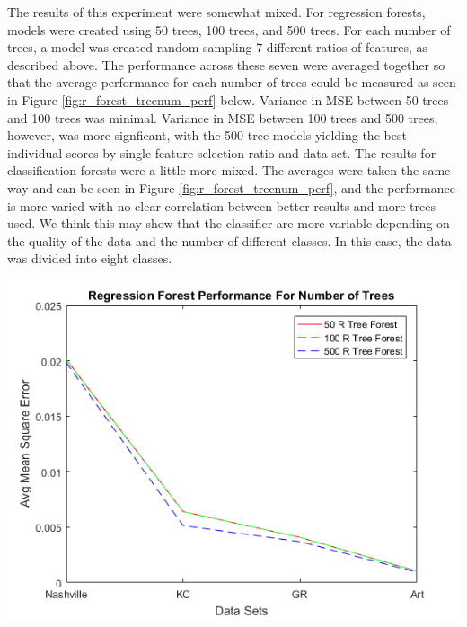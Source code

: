 \documentclass[10pt]{article}
\begin{document}
\begin{multicols}{2}
		The results of this experiment were somewhat mixed. For regression forests, models were created using 50 trees, 100 trees, and 500 trees. For each number of trees, a model was created random sampling 7 different ratios of features, as described above. The performance across these seven were averaged together so that the average performance for each number of trees could be measured as seen in Figure \ref{fig:r_forest_treenum_perf} below. Variance in MSE between 50 trees and 100 trees was minimal. Variance in MSE between 100 trees and 500 trees, however, was more signficant, with the 500 tree models yielding the best individual scores by single feature selection ratio and data set. The results for classification forests were a little more mixed. The averages were taken the same way and can be seen in Figure \ref{fig:r_forest_treenum_perf}, and the performance is more varied with no clear correlation between better results and more trees used. We think this may show that the classifier are more variable depending on the quality of the data and the number of different classes. In this case, the data was divided into eight classes. 

		\begin{center}
		\captionsetup{type=figure}
			\includegraphics[scale=0.6]{Images/RegressionGraphPerformanceForNumberOfTrees} \\
			\label{fig:r_forest_treenum_perf}
		\end{center}


\end{multicols}
\end{document}

